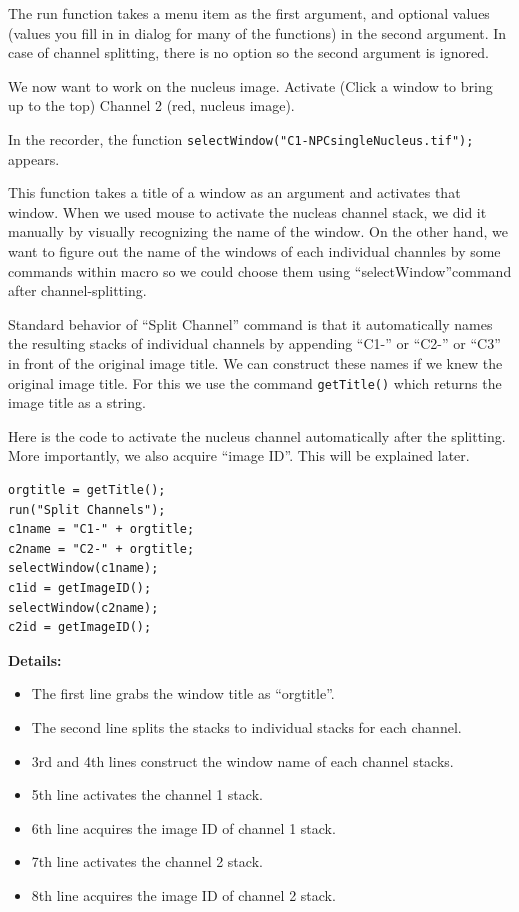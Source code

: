 \documentclass[11pt,a4paper,oneside]{report}
\newcommand{\ilcom}[1]{\texttt{\small#1}}
\begin{document}
The run function takes a menu item as the first argument, and optional values (values you fill in in dialog for many of the functions) in the second argument. In case of channel splitting, there is no option so the second argument is ignored. 

We now want to work on the nucleus image. Activate (Click a window to bring up to the top) Channel 2 (red, nucleus image).

In the recorder, the function \ilcom{selectWindow("C1-NPCsingleNucleus.tif");} appears. 


This function takes a title of a window as an argument and activates that window. When we used mouse to activate the nucleas channel stack, we did it manually by visually recognizing the name of the window. On the other hand, we want to figure out the name of the windows of each individual channles by some commands within macro so we could choose them using ``selectWindow''command after channel-splitting.  

Standard behavior of ``Split Channel'' command is that it automatically names the resulting stacks of individual channels by appending ``C1-'' or ``C2-'' or ``C3'' in front of the original image title. We can construct these names if we knew the original image title. For this we use the command \ilcom{getTitle()} which returns the image title as a string. 


Here is the code to activate the nucleus channel automatically after the splitting. More importantly, we also acquire ``image ID''. This will be explained later.  

\begin{lstlisting}
orgtitle = getTitle();
run("Split Channels");
c1name = "C1-" + orgtitle;
c2name = "C2-" + orgtitle;
selectWindow(c1name);
c1id = getImageID();
selectWindow(c2name);
c2id = getImageID();
\end{lstlisting}

\textbf{Details:} 
\begin{itemize}
\item The first line grabs the window title as ``orgtitle''. 
\item The second line splits the stacks to individual stacks for each channel.
\item 3rd and 4th lines construct the window name of each channel stacks. 
\item 5th line activates the channel 1 stack. 
\item 6th line acquires the image ID of channel 1 stack. 
\item 7th line activates the channel 2 stack. 
\item 8th line acquires the image ID of channel 2 stack. 
\end{itemize}
\end{document}
